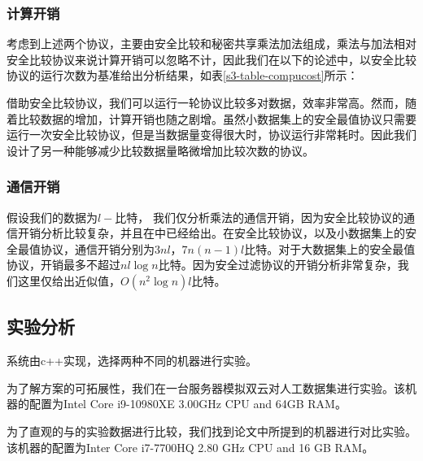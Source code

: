 \subsubsection{计算开销}
考虑到上述两个协议，主要由安全比较和秘密共享乘法加法组成，乘法与加法相对安全比较协议来说计算开销可以忽略不计，因此我们在以下的论述中，以安全比较协议的运行次数为基准给出分析结果，如表\ref{s3-table-compucost}所示：
\begin{table}[htbp]
	\centering	
	\renewcommand{\arraystretch}{1.3}
	\label{s3-table-compucost}
	\caption{Computation Overhead}
\end{table}

借助安全比较协议，我们可以运行一轮协议比较多对数据，效率非常高。然而，随着比较数据的增加，计算开销也随之剧增。虽然小数据集上的安全最值协议只需要运行一次安全比较协议，但是当数据量变得很大时，协议运行非常耗时。因此我们设计了另一种能够减少比较数据量略微增加比较次数的协议。
\subsubsection{通信开销}
假设我们的数据为$ l- $比特， 我们仅分析乘法的通信开销，因为安全比较协议的通信开销分析比较复杂，并且在\cite{rathee2020cryptflow2}中已经给出。在安全比较协议，以及小数据集上的安全最值协议，通信开销分别为$ 3nl $，$ 7n(n-1)l $比特。对于大数据集上的安全最值协议，开销最多不超过$ nl\log n $比特。因为安全过滤协议的开销分析非常复杂，我们这里仅给出近似值，$ O(n^2\log n)l $比特。
\subsection{实验分析}
系统由c++实现，选择两种不同的机器进行实验。

为了解方案的可拓展性，我们在一台服务器模拟双云对人工数据集进行实验。该机器的配置为Intel Core i9-10980XE 3.00GHz CPU and 64GB RAM。

为了直观的与\cite{wu2020secure}的实验数据进行比较，我们找到论文中所提到的机器进行对比实验。该机器的配置为Inter Core i7-7700HQ 2.80 GHz CPU and 16 GB RAM。
